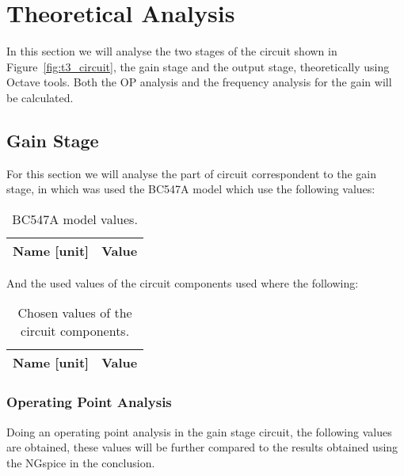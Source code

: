 \newpage
{}
\section{Theoretical Analysis}
\label{sec:analysis}

In this section we will analyse the two stages of the circuit shown in Figure~\ref{fig:t3_circuit}, the gain stage and the output stage, theoretically using Octave tools. Both the OP analysis and the frequency analysis for the gain will be calculated.\par

\subsection{Gain Stage}

For this section we will analyse the part of circuit correspondent to the gain stage, in which was used the BC547A model which use the following values:


\begin{table}[H]
  \centering
  \begin{tabular}{|l|r|}
    \hline    
    {\bf Name [unit]} & {\bf Value} \\ \hline
    
  \end{tabular}
  \caption{BC547A model values.}
  \label{tab:teo}
\end{table}

And the used values of the circuit components used where the following:\par

\begin{table}[H]
	\centering
	\begin{tabular}{|l|r|}
		\hline    
		{\bf Name [unit]} & {\bf Value} \\ \hline
		
	\end{tabular}
	\caption{Chosen values of the circuit components.}
	\label{tab:teo}
\end{table}


\subsubsection{Operating Point Analysis}

Doing an operating point analysis in the gain stage circuit, the following values are obtained, these values will be further compared to the results obtained using the NGspice in the conclusion.\par
 


